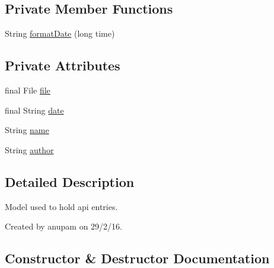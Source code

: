 \subsection*{Private Member Functions}
\begin{DoxyCompactItemize}
\item 
String \hyperlink{classorg_1_1buildmlearn_1_1toolkit_1_1model_1_1SavedApi_a08afce8a527e6be385f7f6b0c645b5ce}{format\+Date} (long time)
\end{DoxyCompactItemize}
\subsection*{Private Attributes}
\begin{DoxyCompactItemize}
\item 
final File \hyperlink{classorg_1_1buildmlearn_1_1toolkit_1_1model_1_1SavedApi_a4d6618eb1dbe1911ae4cfd5f29809f51}{file}
\item 
final String \hyperlink{classorg_1_1buildmlearn_1_1toolkit_1_1model_1_1SavedApi_a2dfeb57d1a979b07d00e9c8a3578b5b0}{date}
\item 
String \hyperlink{classorg_1_1buildmlearn_1_1toolkit_1_1model_1_1SavedApi_aae17c0552791a74ddc24301d675d4f75}{name}
\item 
String \hyperlink{classorg_1_1buildmlearn_1_1toolkit_1_1model_1_1SavedApi_a9bf56d5d385bbc517dd5323e9c91a717}{author}
\end{DoxyCompactItemize}


\subsection{Detailed Description}
Model used to hold api entries. 

Created by anupam on 29/2/16. 

\subsection{Constructor \& Destructor Documentation}
